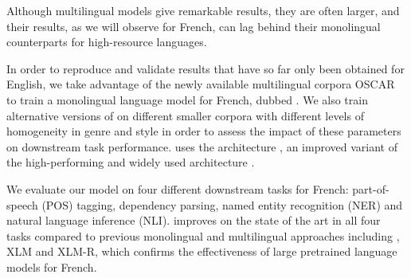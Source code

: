 Although multilingual models give remarkable results, they are often larger, and their results, as we will observe for French, can lag behind their monolingual counterparts for high-resource languages. %

In order to reproduce and validate results that have so far only been obtained for English, we take advantage of the newly available multilingual corpora OSCAR \cite{ortiz-suarez-etal-2019-asynchronous} to train a monolingual language model for French, dubbed \camembert. We also train alternative versions of \camembert on different smaller corpora with different levels of homogeneity in genre and style in order to assess the impact of these parameters on downstream task performance.
\camembert uses the \roberta architecture \cite{liu-etal-2019-roberta}, an improved variant of the high-performing and widely used \bert architecture \cite{devlin-etal-2019-bert}.

We evaluate our model on four different downstream tasks for French: part-of-speech (POS) tagging, dependency parsing, named entity recognition (NER) and natural language inference (NLI).
\camembert improves on the state of the art in all four tasks compared to previous monolingual and multilingual approaches including \mbert, XLM and XLM-R, which confirms the effectiveness of large pretrained language models for French.

